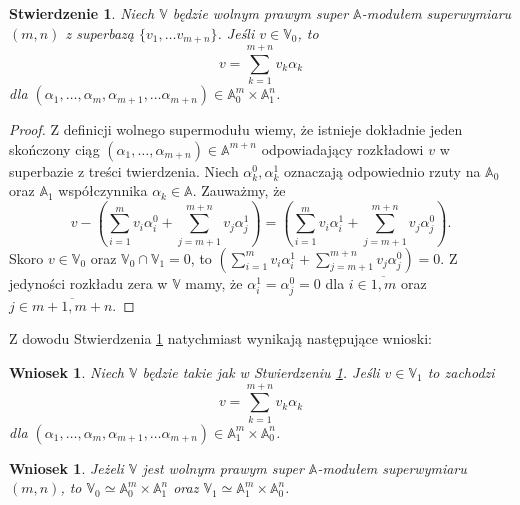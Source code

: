 \documentclass[11pt,a4paper]{report}
\newtheorem{corollary}[theorem]{Wniosek}
\newtheorem{proposition}[theorem]{Stwierdzenie}
\theoremstyle{definition}
\begin{document}
\begin{proposition}
	Niech $\mathbb{V}$ będzie wolnym prawym super $\mathbb{A}$-modułem superwymiaru $(m,n)$ z superbazą $\{ v_1, \ldots v_{m+n} \}$. Jeśli $v \in \mathbb{V}_0$, to
	\begin{equation*}
		v = \sum_{k=1}^{m+n}  v_k \alpha_k
	\end{equation*}
	dla $(\alpha_1, \ldots, \alpha_m, \alpha_{m+1}, \ldots \alpha_{m+n}) \in \mathbb{A}_0^m \times \mathbb{A}_1^n$.
	\label{hom_coeff}
\end{proposition}
\begin{proof}
	Z definicji wolnego supermodułu wiemy, że istnieje dokładnie jeden skończony ciąg $(\alpha_1, \ldots, \alpha_{m+n}) \in \mathbb{A}^{m+n}$ odpowiadający rozkładowi $v$ w superbazie z treści twierdzenia. Niech $\alpha^0_k, \alpha^1_k$ oznaczają odpowiednio rzuty na $\mathbb{A}_0$ oraz $\mathbb{A}_1$ współczynnika $\alpha_k \in \mathbb{A}$. Zauważmy, że
	\begin{equation}
		\label{free_module_decomposition}
		v - \left( \sum_{i=1}^m v_i \alpha_i^0 + \sum_{j=m+1}^{m+n} v_j \alpha_j^1 \right) = \left( \sum_{i=1}^m v_i \alpha_i^1 + \sum_{j=m+1}^{m+n} v_j \alpha_j^0 \right).
	\end{equation}
	Skoro $v \in \mathbb{V}_0$ oraz $\mathbb{V}_0 \cap \mathbb{V}_1 = {0}$, to $\left( \sum_{i=1}^m v_i \alpha_i^1 + \sum_{j=m+1}^{m+n} v_j \alpha_j^0 \right) = 0$. Z jedyności rozkładu zera w $\mathbb{V}$ mamy, że $\alpha^1_i = \alpha^0_j = 0$ dla $i \in \overline{1,m}$ oraz $j \in \overline{m+1,m+n}.$
\end{proof}

Z dowodu Stwierdzenia \ref{hom_coeff} natychmiast wynikają następujące wnioski:

\begin{corollary}
	\label{hom_coeff2}
	Niech $\mathbb{V}$ będzie takie jak w Stwierdzeniu \ref{hom_coeff}. Jeśli $v \in \mathbb{V}_1$ to zachodzi
	\begin{equation*}
		v = \sum_{k=1}^{m+n} v_k \alpha_k
	\end{equation*}
	dla $(\alpha_1, \ldots, \alpha_m, \alpha_{m+1}, \ldots \alpha_{m+n}) \in \mathbb{A}_1^m \times \mathbb{A}_0^n$.
\end{corollary}

\begin{corollary}
	\label{amodule_structure}
	Jeżeli $\mathbb{V}$ jest wolnym prawym super $\mathbb{A}$-modułem superwymiaru $(m,n)$, to $\mathbb{V}_0 \simeq \mathbb{A}_0^m \times \mathbb{A}_1^n$ oraz $\mathbb{V}_1 \simeq \mathbb{A}_1^m \times \mathbb{A}_0^n$. 
\end{corollary}
\end{document}
